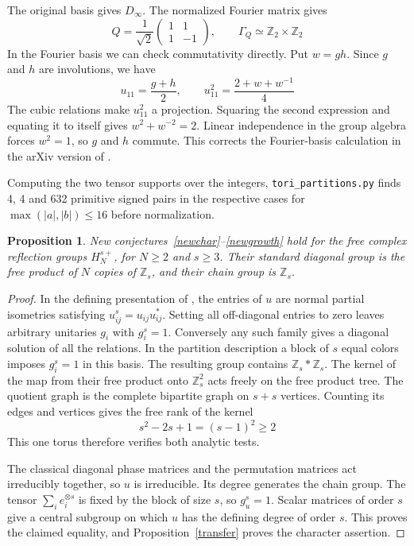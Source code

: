 \documentclass[11pt,a4paper]{article}
\newtheorem{prop}[thm]{Proposition}
\theoremstyle{remark}
\begin{document}
The original basis gives $D_\infty$. The normalized Fourier matrix gives
\[
 Q=\frac{1}{\sqrt2}\begin{pmatrix}1&1\\1&-1\end{pmatrix},\qquad
 \Gamma_Q\simeq\mathbb Z_2\times\mathbb Z_2
\]
In the Fourier basis we can check commutativity directly. Put $w=gh$.
Since $g$ and $h$ are involutions, we have
\[
 u_{11}=\frac{g+h}{2},\qquad u_{11}^2=\frac{2+w+w^{-1}}4
\]
The cubic relations make $u_{11}^2$ a projection. Squaring the second
expression and equating it to itself gives $w^2+w^{-2}=2$.
Linear independence in the group algebra forces $w^2=1$, so $g$ and $h$
commute.
This corrects the Fourier-basis calculation in the arXiv version of
\cite[proof of Theorem~4.4]{bp}.

Computing the two tensor supports over
the integers, \texttt{tori\_partitions.py} finds 4, 4 and 632 primitive
signed pairs in the respective cases for $\max(|a|,|b|)\le16$
before normalization.

\begin{prop}\label{reflectiontest}
New conjectures~\ref{newchar}--\ref{newgrowth} hold for the free
complex reflection groups $H_N^{s+}$, for $N\ge2$ and $s\ge3$.
Their standard diagonal group is the free product of $N$ copies of
$\mathbb Z_s$, and their chain group is $\mathbb Z_s$.
\end{prop}
\begin{proof}
In the defining presentation of \cite{reflection}, the entries of $u$
are normal partial isometries satisfying $u_{ij}^{s}=u_{ij}u_{ij}^*$.
Setting all off-diagonal entries to zero leaves arbitrary unitaries
$g_i$ with $g_i^s=1$. Conversely any such family gives a diagonal
solution of all the relations. In the partition description a block of
$s$ equal colors imposes $g_i^s=1$ in this basis. The resulting group contains $\mathbb Z_s*\mathbb Z_s$. The kernel of
the map from their free product onto $\mathbb Z_s^2$ acts freely on the
free product tree. The quotient graph is the complete bipartite graph on $s+s$ vertices.
Counting its edges and vertices gives the free rank of the kernel
\[
 s^2-2s+1=(s-1)^2\ge2
\] This one
torus therefore verifies both analytic tests.

The classical diagonal phase matrices and the permutation matrices act
irreducibly together, so $u$ is irreducible. Its degree generates the
chain group. The tensor $\sum_i e_i^{\otimes s}$ is fixed by the block
of size $s$, so $g_u^s=1$. Scalar matrices of order $s$ give a central
subgroup on which $u$ has the defining degree of order $s$. This proves
the claimed equality, and Proposition~\ref{transfer} proves the
character assertion.
\end{proof}
\end{document}
